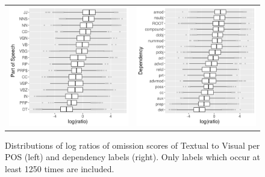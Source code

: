 \begin{figure}[t]
  \centering
  \hspace*{-0.2in}
  \setlength{\tabcolsep}{0pt}
  \begin{tabular}{cc}
  \includegraphics[scale=0.45]{chapters/COLI/imaginet-omission-ratio-pos-boxplot.png} &
  \includegraphics[scale=0.45]{chapters/COLI/imaginet-omission-ratio-dep-boxplot.png} \\
  \end{tabular}
  \caption{Distributions of log ratios of omission scores of {\sc Textual} to {\sc Visual} per
    POS (left) and dependency labels (right). Only labels which occur at least 1250 times are included.}
\label{fig:omission-imaginet-ratio}
\end{figure}



